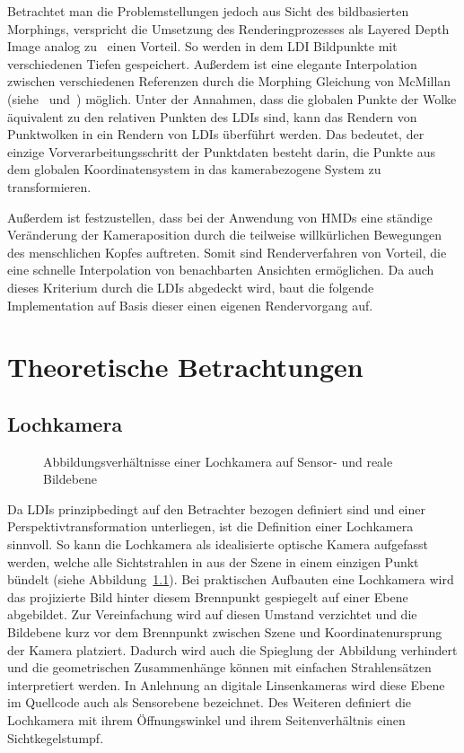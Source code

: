 \documentclass[hyperref, beleg, german]{cgvpub}
\begin{document}
Betrachtet man die Problemstellungen jedoch aus Sicht des bildbasierten
Morphings, verspricht die Umsetzung des Renderingprozesses als Layered Depth
Image analog zu~\cite{chang1999ldi} einen Vorteil. So werden in dem LDI
Bildpunkte mit verschiedenen Tiefen gespeichert. Außerdem ist eine elegante
Interpolation zwischen verschiedenen Referenzen durch die Morphing Gleichung
von McMillan (siehe~\cite{mcmillan1995list} und~\cite{mcmillan1995plenoptic})
möglich. Unter der Annahmen, dass die globalen Punkte der Wolke äquivalent zu
den relativen Punkten des LDIs sind, kann das Rendern von Punktwolken in ein
Rendern von LDIs überführt werden. Das bedeutet, der einzige
Vorverarbeitungsschritt der Punktdaten besteht darin, die Punkte aus dem
globalen Koordinatensystem in das kamerabezogene System zu transformieren.

Außerdem ist festzustellen, dass bei der Anwendung von HMDs eine ständige
Veränderung der Kameraposition durch die teilweise willkürlichen Bewegungen des
menschlichen Kopfes auftreten. Somit sind Renderverfahren von Vorteil, die eine
schnelle Interpolation von benachbarten Ansichten ermöglichen. Da auch dieses
Kriterium durch die LDIs abgedeckt wird, baut die folgende Implementation auf
Basis dieser einen eigenen Rendervorgang auf.

\chapter{Theoretische Betrachtungen}

\section{Lochkamera}

\begin{figure}
	\centering
	
	\caption{Abbildungsverhältnisse einer Lochkamera auf Sensor- und reale
		Bildebene}%
	\label{fig:pinholecamera}
\end{figure}

Da LDIs prinzipbedingt auf den Betrachter bezogen definiert sind und einer
Perspektivtransformation unterliegen, ist die Definition einer Lochkamera
sinnvoll. So kann die Lochkamera als idealisierte optische Kamera aufgefasst
werden, welche alle Sichtstrahlen in aus der Szene in einem einzigen Punkt
bündelt (siehe Abbildung~\ref{fig:pinholecamera}). Bei praktischen Aufbauten
eine Lochkamera wird das projizierte Bild hinter diesem Brennpunkt gespiegelt
auf einer Ebene abgebildet. Zur Vereinfachung wird auf diesen Umstand
verzichtet und die Bildebene kurz vor dem Brennpunkt zwischen Szene und
Koordinatenursprung der Kamera platziert. Dadurch wird auch die Spieglung der
Abbildung verhindert und die geometrischen Zusammenhänge können mit einfachen
Strahlensätzen interpretiert werden. In Anlehnung an digitale Linsenkameras
wird diese Ebene im Quellcode auch als Sensorebene bezeichnet. Des Weiteren
definiert die Lochkamera mit ihrem Öffnungswinkel und ihrem Seitenverhältnis
einen Sichtkegelstumpf.
\end{document}
